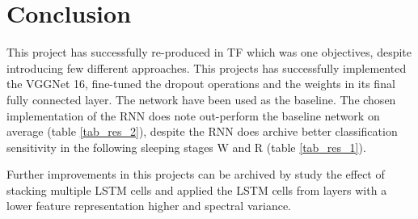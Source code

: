 \section{Conclusion}
\label{sec:conclusion}

This project has successfully re-produced \cite{main_ar} in TF which was one objectives, despite introducing few different approaches. 
This projects has successfully implemented the VGGNet 16, fine-tuned the dropout operations and the weights in its final fully connected layer. The network have been used as the baseline. The chosen implementation of the RNN does note out-perform the baseline network on average (table \ref{tab_res_2}), despite the RNN does archive better classification sensitivity in the following sleeping stages W and R (table \ref{tab_res_1}). 

Further improvements in this projects can be archived by study the effect of stacking multiple LSTM cells and applied the LSTM cells from layers with a lower feature representation higher and spectral variance.